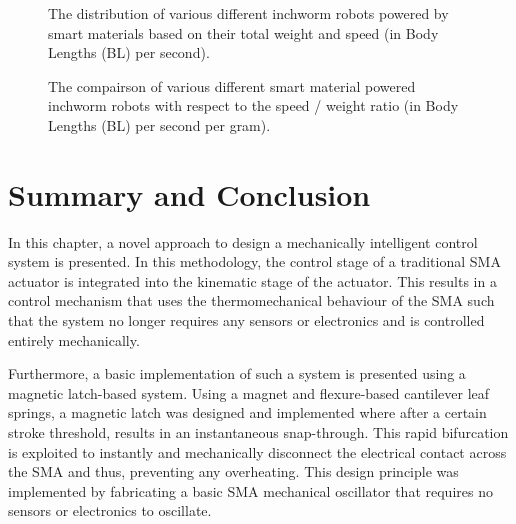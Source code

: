 \begin{figure}[hbt!] %
  \centering
  \resizebox{0.9\columnwidth}{!}{}
  \caption{The distribution of various different inchworm robots powered by smart materials based on their total weight and speed (in Body Lengths (BL) per second).}
  \label{fig:inchworm-compare-speed-weight}
\end{figure}

\begin{figure}[hbt!] %
  \centering
  \resizebox{0.9\columnwidth}{!}{}
  \caption{The compairson of various different smart material powered inchworm robots with respect to the speed / weight ratio (in Body Lengths (BL) per second per gram).}
  \label{fig:inchworm-compare-speedweight-weight}
\end{figure}

\section{Summary and Conclusion}
In this chapter, a novel approach to design a mechanically intelligent control system is presented. In this methodology, the control stage of a traditional SMA actuator is integrated into the kinematic stage of the actuator. This results in a control mechanism that uses the thermomechanical behaviour of the SMA such that the system no longer requires any sensors or electronics and is controlled entirely mechanically.

Furthermore, a basic implementation of such a system is presented using a magnetic latch-based system. Using a magnet and flexure-based cantilever leaf springs, a magnetic latch was designed and implemented where after a certain stroke threshold, results in an instantaneous snap-through. This rapid bifurcation is exploited to instantly and mechanically disconnect the electrical contact across the SMA and thus, preventing any overheating. This design principle was implemented by fabricating a basic SMA mechanical oscillator that requires no sensors or electronics to oscillate.


